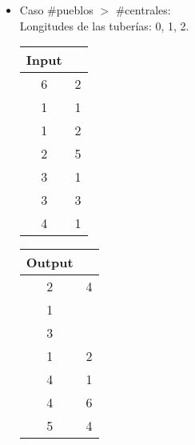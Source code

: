 \documentclass[11pt, a4paper, twoside]{article}
\begin{document}
\begin{figure}[H]
  \begin{itemize}
	\item Caso \#pueblos $>$ \#centrales: \\
	   Longitudes de las tuberías: 0, 1, 2. \\
	   \begin{minipage}{0.2\textwidth}
			\begin{tabular}{cc}
				   Input \\
				   \hline
				   6 & 2 \\
				   1 & 1 \\
				   1 & 2 \\
				   2 & 5 \\
				   3 & 1 \\
				   3 & 3 \\
				   4 & 1 \\
			\end{tabular}
		\end{minipage} 
		\begin{minipage}{0.2\textwidth}
			\begin{tabular}{cc}
			   Output \\
			   \hline
			   2 & 4 \\
			   1 &  \\
			   3 &  \\
			   1 & 2 \\
			   4 & 1 \\
			   4 & 6 \\
			   5 & 4 \\
			\end{tabular}
	   \end{minipage}  \\


\end{itemize}
\end{figure}
\end{document}
